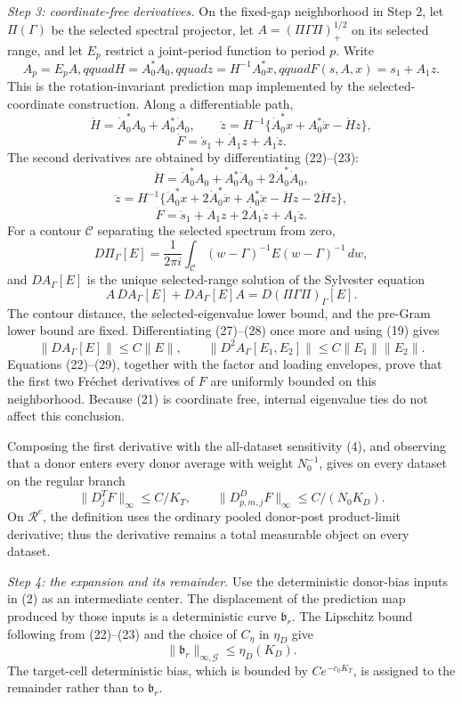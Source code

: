 \emph{Step 3: coordinate-free derivatives.}
On the fixed-gap neighborhood in Step 2, let \(\Pi(\Gamma)\) be the selected spectral projector, let \(A=(\Pi\Gamma\Pi)_+^{1/2}\) on its selected range, and let \(E_p\) restrict a joint-period function to period \(p\).  Write
\[
 A_p=E_pA,qquad H=A_0^*A_0,qquad
 z=H^{-1}A_0^*x,qquad F(s,A,x)=s_1+A_1z.
\tag{21}
\]
This is the rotation-invariant prediction map implemented by the selected-coordinate construction.  Along a differentiable path,
\[
 \dot H=\dot A_0^*A_0+A_0^*\dot A_0,
 \qquad
 \dot z=H^{-1}\{\dot A_0^*x+A_0^*\dot x-\dot Hz\},
\tag{22}
\]
\[
 \dot F=\dot s_1+\dot A_1z+A_1\dot z.
\tag{23}
\]
The second derivatives are obtained by differentiating (22)--(23):
\[
 \ddot H=\ddot A_0^*A_0+A_0^*\ddot A_0
          +2\dot A_0^*\dot A_0,
\tag{24}
\]
\[
 \ddot z=H^{-1}\{\ddot A_0^*x+2\dot A_0^*\dot x
 +A_0^*\ddot x-\ddot Hz-2\dot H\dot z\},
\tag{25}
\]
\[
 \ddot F=\ddot s_1+\ddot A_1z+2\dot A_1\dot z+A_1\ddot z.
\tag{26}
\]
For a contour \(\mathscr C\) separating the selected spectrum from zero,
\[
 D\Pi_\Gamma[E]=\frac{1}{2\pi i}\int_{\mathscr C}
 (w-\Gamma)^{-1}E(w-\Gamma)^{-1}\,dw,
\tag{27}
\]
and \(DA_\Gamma[E]\) is the unique selected-range solution of the Sylvester equation
\[
 A\,DA_\Gamma[E]+DA_\Gamma[E]A
 =D(\Pi\Gamma\Pi)_\Gamma[E].
\tag{28}
\]
The contour distance, the selected-eigenvalue lower bound, and the pre-Gram lower bound are fixed.  Differentiating (27)--(28) once more and using (19) gives
\[
 \|DA_\Gamma[E]\|\le C\|E\|,
 \qquad
 \|D^2A_\Gamma[E_1,E_2]\|
 \le C\|E_1\|\|E_2\|.
\tag{29}
\]
Equations (22)--(29), together with the factor and loading envelopes, prove that the first two Fr\'echet derivatives of \(F\) are uniformly bounded on this neighborhood.  Because (21) is coordinate free, internal eigenvalue ties do not affect this conclusion.

Composing the first derivative with the all-dataset sensitivity (4), and observing that a donor enters every donor average with weight \(N_0^{-1}\), gives on every dataset on the regular branch
\[
 \|D_j^TF\|_\infty\le C/K_T,
 \qquad
 \|D_{p,m,j}^DF\|_\infty\le C/(N_0K_D).
\tag{30}
\]
On \(\mathcal R^c\), the definition uses the ordinary pooled donor-post product-limit derivative; thus the derivative remains a total measurable object on every dataset.

\emph{Step 4: the expansion and its remainder.}
Use the deterministic donor-bias inputs in (2) as an intermediate center.  The displacement of the prediction map produced by those inputs is a deterministic curve \(\mathfrak b_r\).  The Lipschitz bound following from (22)--(23) and the choice of \(C_\eta\) in \(\eta_D\) give
\[
 \|\mathfrak b_r\|_{\infty,\mathcal G}
 \le\eta_D(K_D).
\tag{31}
\]
The target-cell deterministic bias, which is bounded by \(Ce^{-c_0K_T}\), is assigned to the remainder rather than to \(\mathfrak b_r\).


